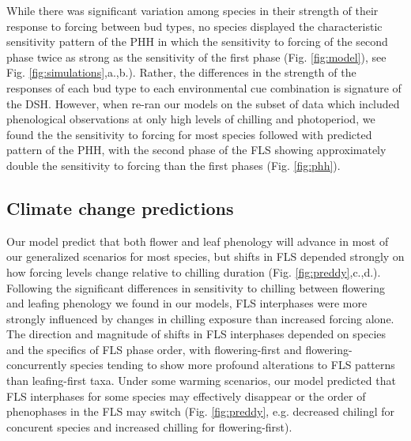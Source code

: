 \documentclass[11pt]{article}\usepackage[]{graphicx}\usepackage[]{color}
\begin{document}
\noindent While there was significant variation among species in their strength of their response to forcing between bud types, no species displayed the characteristic sensitivity pattern of the PHH in which the sensitivity to forcing of the second phase twice as strong as the sensitivity of the first phase (Fig. \ref{fig:model}), see Fig. \ref{fig:simulations},a.,b.). Rather, the differences in the strength of the responses of each bud type to each environmental cue combination is signature of the DSH. However, when re-ran our models on the subset of data which included phenological observations at only high levels of chilling and photoperiod, we found the the sensitivity to forcing for most species followed with predicted pattern of the PHH, with the second phase of the FLS showing approximately double the sensitivity to forcing than the first phases (Fig. \ref{fig:phh}).\\

\subsection*{Climate change predictions}
\noindent Our model predict that both flower and leaf phenology will advance in most of our generalized scenarios for most species, but shifts in FLS depended strongly on how forcing levels change relative to chilling duration (Fig. \ref{fig:preddy},c.,d.). Following the significant differences in sensitivity to chilling between flowering and leafing phenology we found in our models, FLS interphases were more strongly influenced by changes in chilling exposure than increased forcing alone. The direction and magnitude of shifts in FLS interphases depended on species and the specifics of FLS phase order, with flowering-first and flowering-concurrently species tending to show more profound alterations to FLS patterns than leafing-first taxa. Under some warming scenarios, our model predicted that  FLS interphases for some species may effectively disappear or the order of phenophases in the FLS may switch (Fig. \ref{fig:preddy}, e.g. decreased chilingl for concurent species and increased chilling for flowering-first).
\end{document}
